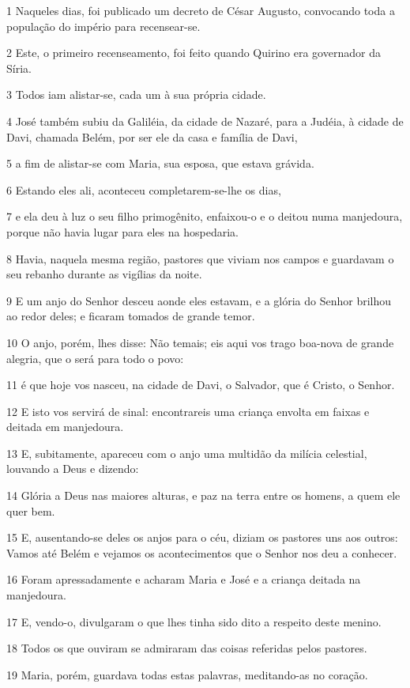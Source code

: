 \par 1 Naqueles dias, foi publicado um decreto de César Augusto, convocando toda a população do império para recensear-se.
\par 2 Este, o primeiro recenseamento, foi feito quando Quirino era governador da Síria.
\par 3 Todos iam alistar-se, cada um à sua própria cidade.
\par 4 José também subiu da Galiléia, da cidade de Nazaré, para a Judéia, à cidade de Davi, chamada Belém, por ser ele da casa e família de Davi,
\par 5 a fim de alistar-se com Maria, sua esposa, que estava grávida.
\par 6 Estando eles ali, aconteceu completarem-se-lhe os dias,
\par 7 e ela deu à luz o seu filho primogênito, enfaixou-o e o deitou numa manjedoura, porque não havia lugar para eles na hospedaria.
\par 8 Havia, naquela mesma região, pastores que viviam nos campos e guardavam o seu rebanho durante as vigílias da noite.
\par 9 E um anjo do Senhor desceu aonde eles estavam, e a glória do Senhor brilhou ao redor deles; e ficaram tomados de grande temor.
\par 10 O anjo, porém, lhes disse: Não temais; eis aqui vos trago boa-nova de grande alegria, que o será para todo o povo:
\par 11 é que hoje vos nasceu, na cidade de Davi, o Salvador, que é Cristo, o Senhor.
\par 12 E isto vos servirá de sinal: encontrareis uma criança envolta em faixas e deitada em manjedoura.
\par 13 E, subitamente, apareceu com o anjo uma multidão da milícia celestial, louvando a Deus e dizendo:
\par 14 Glória a Deus nas maiores alturas, e paz na terra entre os homens, a quem ele quer bem.
\par 15 E, ausentando-se deles os anjos para o céu, diziam os pastores uns aos outros: Vamos até Belém e vejamos os acontecimentos que o Senhor nos deu a conhecer.
\par 16 Foram apressadamente e acharam Maria e José e a criança deitada na manjedoura.
\par 17 E, vendo-o, divulgaram o que lhes tinha sido dito a respeito deste menino.
\par 18 Todos os que ouviram se admiraram das coisas referidas pelos pastores.
\par 19 Maria, porém, guardava todas estas palavras, meditando-as no coração.
